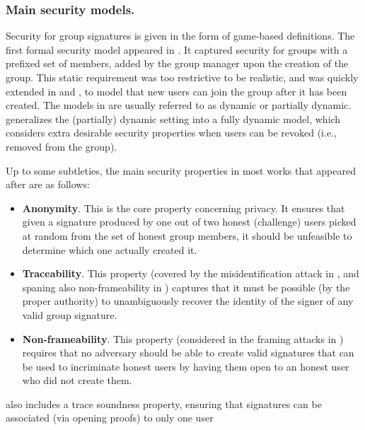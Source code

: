 \subsubsection{Main security models.}
%
Security for group signatures is given in the form of game-based definitions.
The first formal security model appeared in \cite{bmw03}. It captured security
for groups with a prefixed set of members, added by the group manager upon the
creation of the group. This static requirement was too restrictive to be
realistic, and was quickly extended in \cite{bsz05} and \cite{kty04,ky06}, to
model that new users can join the group after it has been created. The models
in \cite{bsz05,kty04,ky06} are usually referred to as dynamic or partially
dynamic. \cite{bcc+16} generalizes the (partially) dynamic setting into a fully
dynamic model, which considers extra desirable security properties when users
can be revoked (i.e., removed from the group).

Up to some subtleties, the main security properties in most works that appeared
after \cite{bmw03,bsz05,kty04,ky06} are as follows:

\begin{itemize}
\item {\bf Anonymity}. This is the core property concerning privacy. It
  ensures that given a signature produced by one out of two honest (challenge)
  users picked at random from the set of honest group members, it should be
  unfeasible to determine which one actually created it. 
  
\item {\bf Traceability}. This property (covered by the misidentification attack
  in \cite{kty04,ky06}, and spaning also non-frameability in \cite{bmw03})
  captures that it must be possible (by the proper authority) to unambiguously
  recover the identity of the signer of any valid group signature.

\item {\bf Non-frameability}. This property (considered in the framing attacks
  in \cite{kty04,ky06}) requires that no adversary should be able to create
  valid signatures that can be used to incriminate honest users by having them
  open to an honest user who did not create them.
 
\end{itemize}

\cite{bcc+16} also includes a trace soundness property, ensuring that signatures
can be associated (via opening proofs) to only one user 

